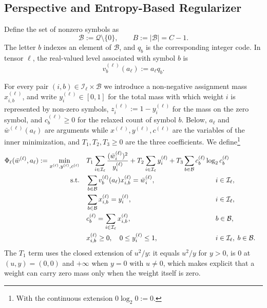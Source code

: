 \documentclass{article}
\begin{document}
\subsection{Perspective and Entropy-Based Regularizer}
\label{sec:metaq-value}

Define the set of nonzero symbols as
\[
  \mathcal B:=\mathcal Q\setminus\{0\},
  \qquad B:=|\mathcal B|=C-1.
\]
The letter $b$ indexes an element of $\mathcal B$, and $q_b$ is the
corresponding integer code. In tensor $\ell$, the real-valued level associated
with symbol $b$ is
\begin{equation}
  v_b^{(\ell)}(a_\ell):=a_\ell q_b.
  \label{eq:real-level}
\end{equation}

For every pair $(i,b)\in\mathcal I_\ell\times\mathcal B$ we introduce a
non-negative assignment mass $x_{i,b}^{(\ell)}$, and write
$y_i^{(\ell)}\in[0,1]$ for the total mass with which weight $i$ is represented by
non-zero symbols, $z_i^{(\ell)}:=1-y_i^{(\ell)}$ for the mass on the zero symbol,
and $c_b^{(\ell)}\geq0$ for the relaxed count of symbol $b$. Below, $a_\ell$ and
$\bar w^{(\ell)}(a_\ell)$ are arguments while $x^{(\ell)},y^{(\ell)},c^{(\ell)}$
are the variables of the inner minimization, and $T_1,T_2,T_3\geq0$ are the three
coefficients. We define\footnote{With the continuous extension
$0\log_2 0:=0$.}
\begin{align}
 \Phi_\ell(\bar w^{(\ell)},a_\ell)
 :=\min_{x^{(\ell)},y^{(\ell)},c^{(\ell)}}\quad&
 T_1\sum_{i\in\mathcal I_\ell}
      \frac{(\bar w_i^{(\ell)})^2}{y_i^{(\ell)}}
 +T_2\sum_{i\in\mathcal I_\ell}y_i^{(\ell)}
 +T_3\sum_{b\in\mathcal B}
      c_b^{(\ell)}\log_2 c_b^{(\ell)}
 \label{eq:metaq-value}\\
 \text{s.t.}\quad&
 \sum_{b\in\mathcal B}
 v_b^{(\ell)}(a_\ell)x_{i,b}^{(\ell)}
 =\bar w_i^{(\ell)},
 &&\hspace{-3em} i\in\mathcal I_\ell,
 \label{eq:representation}\\
 &
 \sum_{b\in\mathcal B}x_{i,b}^{(\ell)}
 =y_i^{(\ell)},
 &&\hspace{-3em} i\in\mathcal I_\ell,
 \label{eq:mass}\\
 &
 c_b^{(\ell)}
 =\sum_{i\in\mathcal I_\ell}x_{i,b}^{(\ell)},
 &&\hspace{-3em} b\in\mathcal B,
 \label{eq:counts}\\
 &
 x_{i,b}^{(\ell)}\geq0,
 \quad 0\leq y_i^{(\ell)}\leq1,
 &&\hspace{-3em} i\in\mathcal I_\ell,\; b\in\mathcal B.
 \label{eq:domain}
\end{align}
The $T_1$ term uses the closed extension of $u^2/y$: it equals $u^2/y$ for
$y>0$, is $0$ at $(u,y)=(0,0)$ and $+\infty$ when $y=0$ with $u\neq0$, which
makes explicit that a weight can carry zero mass only when the weight itself is
zero.
\end{document}
